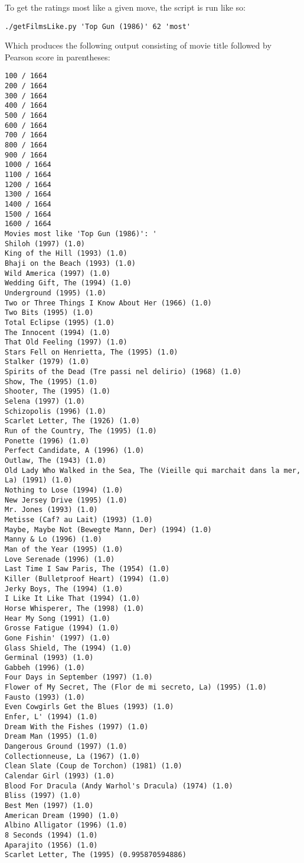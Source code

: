 \documentclass[letterpaper,11pt]{article}
\begin{document}


To get the ratings most like a given move, the script is run like so:
\begin{lstlisting}
./getFilmsLike.py 'Top Gun (1986)' 62 'most'
\end{lstlisting}

Which produces the following output consisting of movie title followed by Pearson score in parentheses:
\begin{lstlisting}[frame=single]
100 / 1664
200 / 1664
300 / 1664
400 / 1664
500 / 1664
600 / 1664
700 / 1664
800 / 1664
900 / 1664
1000 / 1664
1100 / 1664
1200 / 1664
1300 / 1664
1400 / 1664
1500 / 1664
1600 / 1664
Movies most like 'Top Gun (1986)': '
Shiloh (1997) (1.0)
King of the Hill (1993) (1.0)
Bhaji on the Beach (1993) (1.0)
Wild America (1997) (1.0)
Wedding Gift, The (1994) (1.0)
Underground (1995) (1.0)
Two or Three Things I Know About Her (1966) (1.0)
Two Bits (1995) (1.0)
Total Eclipse (1995) (1.0)
The Innocent (1994) (1.0)
That Old Feeling (1997) (1.0)
Stars Fell on Henrietta, The (1995) (1.0)
Stalker (1979) (1.0)
Spirits of the Dead (Tre passi nel delirio) (1968) (1.0)
Show, The (1995) (1.0)
Shooter, The (1995) (1.0)
Selena (1997) (1.0)
Schizopolis (1996) (1.0)
Scarlet Letter, The (1926) (1.0)
Run of the Country, The (1995) (1.0)
Ponette (1996) (1.0)
Perfect Candidate, A (1996) (1.0)
Outlaw, The (1943) (1.0)
Old Lady Who Walked in the Sea, The (Vieille qui marchait dans la mer, La) (1991) (1.0)
Nothing to Lose (1994) (1.0)
New Jersey Drive (1995) (1.0)
Mr. Jones (1993) (1.0)
Metisse (Caf? au Lait) (1993) (1.0)
Maybe, Maybe Not (Bewegte Mann, Der) (1994) (1.0)
Manny & Lo (1996) (1.0)
Man of the Year (1995) (1.0)
Love Serenade (1996) (1.0)
Last Time I Saw Paris, The (1954) (1.0)
Killer (Bulletproof Heart) (1994) (1.0)
Jerky Boys, The (1994) (1.0)
I Like It Like That (1994) (1.0)
Horse Whisperer, The (1998) (1.0)
Hear My Song (1991) (1.0)
Grosse Fatigue (1994) (1.0)
Gone Fishin' (1997) (1.0)
Glass Shield, The (1994) (1.0)
Germinal (1993) (1.0)
Gabbeh (1996) (1.0)
Four Days in September (1997) (1.0)
Flower of My Secret, The (Flor de mi secreto, La) (1995) (1.0)
Fausto (1993) (1.0)
Even Cowgirls Get the Blues (1993) (1.0)
Enfer, L' (1994) (1.0)
Dream With the Fishes (1997) (1.0)
Dream Man (1995) (1.0)
Dangerous Ground (1997) (1.0)
Collectionneuse, La (1967) (1.0)
Clean Slate (Coup de Torchon) (1981) (1.0)
Calendar Girl (1993) (1.0)
Blood For Dracula (Andy Warhol's Dracula) (1974) (1.0)
Bliss (1997) (1.0)
Best Men (1997) (1.0)
American Dream (1990) (1.0)
Albino Alligator (1996) (1.0)
8 Seconds (1994) (1.0)
Aparajito (1956) (1.0)
Scarlet Letter, The (1995) (0.995870594886)
\end{lstlisting}
\end{document}
